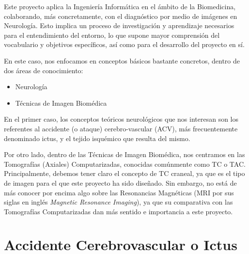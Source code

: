 
Este proyecto aplica la Ingeniería Informática en el ámbito de la Biomedicina, colaborando, más concretamente, con el diagnóstico por medio de imágenes en Neurología. Esto implica un proceso de investigación y aprendizaje necesarios para el entendimiento del entorno, lo que supone mayor comprensión del vocabulario y objetivos específicos, así como para el desarrollo del proyecto en sí.

En este caso, nos enfocamos en conceptos básicos bastante concretos, dentro de dos áreas de conocimiento:
\begin{itemize}
	\item Neurología
	\item Técnicas de Imagen Biomédica
\end{itemize}

En el primer caso, los conceptos teóricos neurológicos que nos interesan son los referentes al accidente (o ataque) cerebro-vascular (ACV), más frecuentemente denominado ictus, y el tejido isquémico que resulta del mismo.

Por otro lado, dentro de las Técnicas de Imagen Biomédica, nos centramos en las Tomografías (Axiales) Computarizadas, conocidas comúnmente como TC o TAC. Principalmente, debemos tener claro el concepto de TC craneal, ya que es el tipo de imagen para el que este proyecto ha sido diseñado. Sin embargo, no está de más conocer por encima algo sobre las Resonancias Magnéticas (MRI por sus siglas en inglés \textit{Magnetic Resonance Imaging}), ya que su comparativa con las Tomografías Computarizadas dan más sentido e importancia a este proyecto.


\section{Accidente Cerebrovascular o Ictus}

